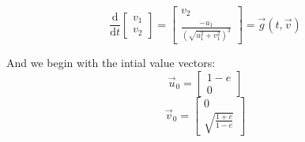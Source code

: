 \documentclass[11pt]{article}
\begin{document}
\[\frac{\text{d}}{\text{d}t} \begin{bmatrix} v_1 \\ v_2 \end{bmatrix} = \begin{bmatrix} v_2 \\ \frac{-u_1}{(\sqrt{u_1^2 + v_1^2})^{ 3}} \end{bmatrix} = \vec{g}(t, \vec{v})\]

And we begin with the intial value vectors:
\[\vec{u}_0 = \begin{bmatrix} 1-e \\ 0 \end{bmatrix}\]
\[\vec{v}_0 = \begin{bmatrix} 0 \\ \sqrt{\frac{1+e}{1-e}} \end{bmatrix}\]
\end{document}
